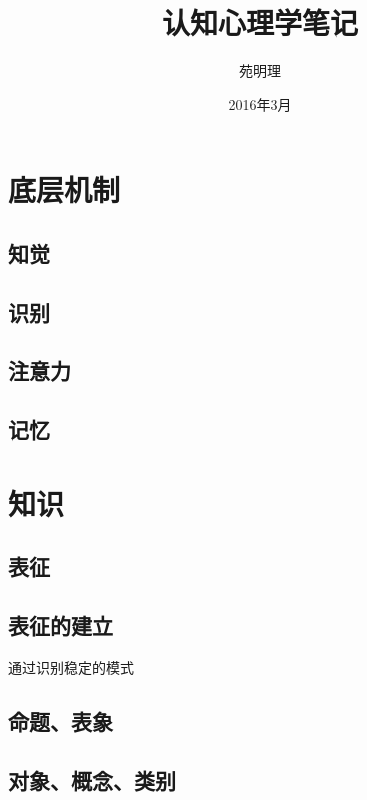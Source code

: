 \documentclass[a4paper,12pt]{article}
\title{认知心理学笔记}
\author{苑明理}
\date{2016年3月}
\begin{document}
\maketitle{}

\renewcommand\contentsname{目录}
\setcounter{tocdepth}{2}
\tableofcontents

\newpage

\section{底层机制}

\subsection{知觉}

\subsection{识别}

\subsection{注意力}

\subsection{记忆}

\section{知识}

\subsection{表征}

\subsection{表征的建立}

通过识别稳定的模式

\subsection{命题、表象}

\subsection{对象、概念、类别}
\end{document}

